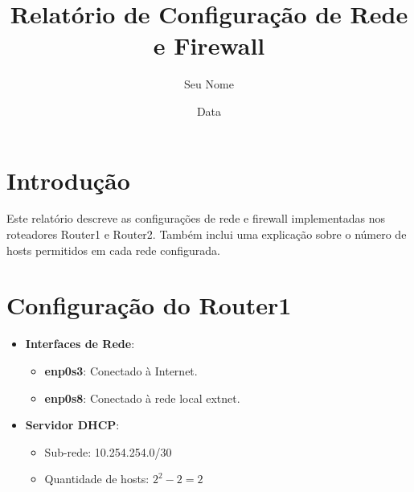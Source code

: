 \documentclass{article}
\title{Relatório de Configuração de Rede e Firewall}
\author{Seu Nome}
\date{Data}
\begin{document}
\maketitle

\section{Introdução}
Este relatório descreve as configurações de rede e firewall implementadas nos roteadores Router1 e Router2. Também inclui uma explicação sobre o número de hosts permitidos em cada rede configurada.

\section{Configuração do Router1}
\begin{itemize}
    \item \textbf{Interfaces de Rede}:
    \begin{itemize}
        \item \textbf{enp0s3}: Conectado à Internet.
        \item \textbf{enp0s8}: Conectado à rede local extnet.
    \end{itemize}
    \item \textbf{Servidor DHCP}:
    \begin{itemize}
        \item Sub-rede: 10.254.254.0/30
        \item Quantidade de hosts: \(2^2 - 2 = 2\)
    \end{itemize}
\end{itemize}
\end{document}
